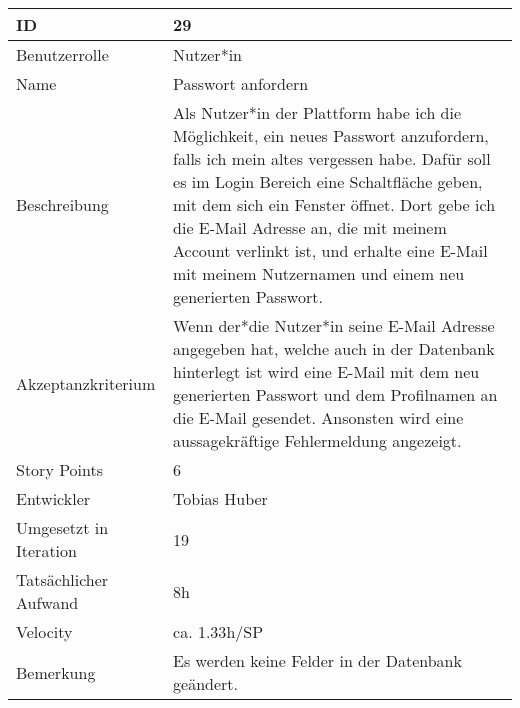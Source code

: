 \begin{tabularx}{\textwidth}{|p{}|X|}
	\hline
	ID & 29 \\
	\hline
	Benutzerrolle & Nutzer*in \\
	\hline
	Name & Passwort anfordern\\
	\hline
	Beschreibung & Als Nutzer*in der Plattform habe ich die Möglichkeit, ein neues Passwort anzufordern, falls ich mein altes vergessen habe. Dafür soll es im Login Bereich eine Schaltfläche geben, mit dem sich ein Fenster öffnet. Dort gebe ich die E-Mail Adresse an, die mit meinem Account verlinkt ist, und erhalte eine E-Mail mit meinem Nutzernamen und einem neu generierten Passwort. \\
	\hline
	Akzeptanzkriterium & Wenn der*die Nutzer*in seine E-Mail Adresse angegeben hat, welche auch in der Datenbank hinterlegt ist wird eine E-Mail mit dem neu generierten Passwort und dem Profilnamen an die E-Mail gesendet. Ansonsten wird eine aussagekräftige Fehlermeldung angezeigt. \\
	\hline
	Story Points & 6\\
	\hline
	Entwickler & Tobias Huber\\
	\hline
	Umgesetzt in Iteration & 19\\
	\hline
	Tatsächlicher Aufwand & 8h\\
	\hline
	Velocity & ca. 1.33h/SP\\
	\hline
	Bemerkung & Es werden keine Felder in der Datenbank geändert.\\
	\hline
\end{tabularx}
\vspace{20pt}
